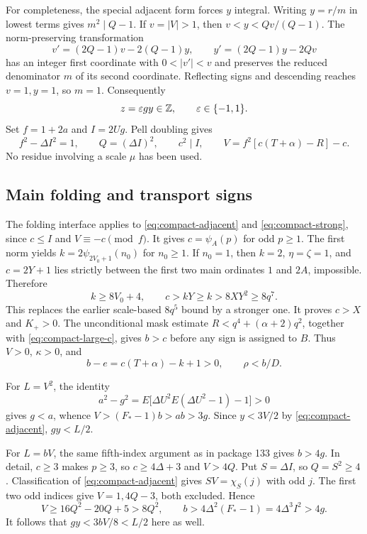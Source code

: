 For completeness, the special adjacent form forces $y$ integral.
Writing $y=r/m$ in lowest terms gives $m^2\mid Q-1$. If
$v=|V|>1$, then $v<y<Qv/(Q-1)$. The norm-preserving transformation
\[
 v'=(2Q-1)v-2(Q-1)y,\qquad
 y'=(2Q-1)y-2Qv
\]
has an integer first coordinate with $0<|v'|<v$ and preserves the
reduced denominator $m$ of its second coordinate. Reflecting signs and
descending reaches $v=1,y=1$, so $m=1$. Consequently
\[
 z=\varepsilon gy\in\mathbb Z,\qquad \varepsilon\in\{-1,1\}.
\]
Set $f=1+2a$ and $I=2Ug$. Pell doubling gives
\begin{equation}
 f^2-\Delta I^2=1,\qquad Q=(\Delta I)^2,\qquad c^2\mid I,
 \qquad V=f^2[c(T+\alpha)-R]-c.
 \label{eq:compact-strong}
\end{equation}
No residue involving a scale $\mu$ has been used.

\subsection{Main folding and transport signs}

The folding interface applies to \eqref{eq:compact-adjacent} and
\eqref{eq:compact-strong}, since $c\le I$ and $V\equiv-c\pmod f$.
It gives $c=\psi_A(p)$ for odd $p\ge1$. The first norm yields
$k=2\psi_{2V_0+1}(n_0)$ for $n_0\ge1$. If $n_0=1$, then
$k=2$, $\eta=\zeta=1$, and $c=2Y+1$ lies strictly between the first
two main ordinates $1$ and $2A$, impossible. Therefore
\begin{equation}
 k\ge8V_0+4,\qquad
 c>kY\ge k>8XY^2\ge8q^7.
 \label{eq:compact-large-c}
\end{equation}
This replaces the earlier scale-based $8q^5$ bound by a stronger one.
It proves $c>X$ and $K_+>0$.
The unconditional mask estimate
$R<q^4+(\alpha+2)q^2$, together with
\eqref{eq:compact-large-c}, gives $b>c$ before any sign is assigned
to $B$. Thus $V>0$, $\kappa>0$, and
\begin{equation}
 b-e=c(T+\alpha)-k+1>0,\qquad \rho<b/D.
 \label{eq:compact-rho}
\end{equation}

For $L=V^2$, the identity
\[
 a^2-g^2=E\bigl[\Delta U^2E(\Delta U^2-1)-1\bigr]>0
\]
gives $g<a$, whence $V>(F_*-1)b>ab>3g$. Since
$y<3V/2$ by \eqref{eq:compact-adjacent}, $gy<L/2$.

For $L=bV$, the same fifth-index argument as in package 133 gives
$b>4g$. In detail, $c\ge3$ makes $p\ge3$, so $c\ge4\Delta+3$ and
$V>4Q$. Put $S=\Delta I$, so $Q=S^2\ge4$. Classification of
\eqref{eq:compact-adjacent} gives $SV=\chi_S(j)$ with odd $j$.
The first two odd indices give $V=1,4Q-3$, both excluded. Hence
\[
 V\ge16Q^2-20Q+5>8Q^2,
 \qquad b>4\Delta^2(F_*-1)=4\Delta^3I^2>4g.
\]
It follows that $gy<3bV/8<L/2$ here as well.

